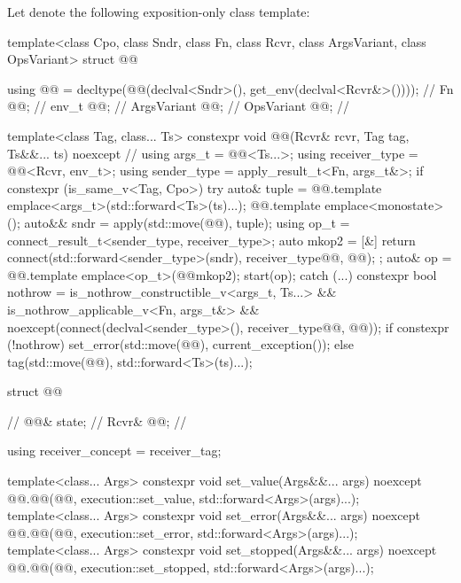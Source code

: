 \pnum
Let  denote the following exposition-only class template:
\begin{codeblock}
template<class Cpo, class Sndr, class Fn, class Rcvr, class ArgsVariant, class OpsVariant>
struct @@ {
  using @@ = decltype(@@(declval<Sndr>(), get_env(declval<Rcvr&>())));  // \expos
  Fn @@;                                                                        // \expos
  env_t @@;                                                                    // \expos
  ArgsVariant @@;                                                             // \expos
  OpsVariant @@;                                                               // \expos

  template<class Tag, class... Ts>
  constexpr void @@(Rcvr& rcvr, Tag tag, Ts&&... ts) noexcept {               // \expos
    using args_t = @@<Ts...>;
    using receiver_type = @@<Rcvr, env_t>;
    using sender_type = apply_result_t<Fn, args_t&>;
    if constexpr (is_same_v<Tag, Cpo>) {
      try {
        auto& tuple = @@.template emplace<args_t>(std::forward<Ts>(ts)...);
        @@.template emplace<monostate>();
        auto&& sndr = apply(std::move(@@), tuple);
        using op_t = connect_result_t<sender_type, receiver_type>;
        auto mkop2 = [&] {
          return connect(std::forward<sender_type>(sndr),
          receiver_type{@@, @@});
        };
        auto& op = @@.template emplace<op_t>(@@{mkop2});
        start(op);
      } catch (...) {
        constexpr bool nothrow =
          is_nothrow_constructible_v<args_t, Ts...> &&
          is_nothrow_applicable_v<Fn, args_t&> &&
          noexcept(connect(declval<sender_type>(), receiver_type{@@, @@}));
        if constexpr (!nothrow) {
          set_error(std::move(@@), current_exception());
        }
      }
    } else {
      tag(std::move(@@), std::forward<Ts>(ts)...);
    }
  }

  struct @@ {     // \expos
    @@& state;   // \expos
    Rcvr& @@;         // \expos

    using receiver_concept = receiver_tag;

    template<class... Args>
    constexpr void set_value(Args&&... args) noexcept {
      @@.@@(@@, execution::set_value, std::forward<Args>(args)...);
    }
    template<class... Args>
    constexpr void set_error(Args&&... args) noexcept {
      @@.@@(@@, execution::set_error, std::forward<Args>(args)...);
    }
    template<class... Args>
    constexpr void set_stopped(Args&&... args) noexcept {
      @@.@@(@@, execution::set_stopped, std::forward<Args>(args)...);
    }

}}
\end{codeblock}
